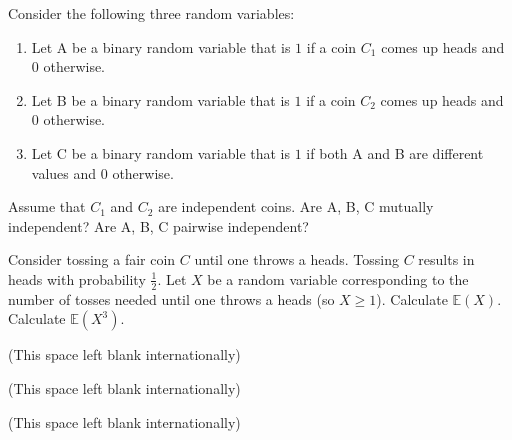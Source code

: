 \documentclass[12pt,twoside]{article}
\begin{document}
\newpage

\begin{problem}{10}
Consider the following three random variables:
\begin{enumerate}
\item Let A be a binary random variable that is $1$ if a coin $C_1$ comes up heads and $0$ otherwise.
\item Let B be a binary random variable that is $1$ if a coin $C_2$ comes up heads and $0$ otherwise.
\item Let C be a binary random variable that is $1$ if both A and B are different values and $0$ otherwise.
\end{enumerate}
Assume that $C_1$ and $C_2$ are independent coins.
\bparts
{} Are A, B, C mutually independent?
 Are A, B, C pairwise independent?
\eparts
\end{problem}
\newpage

\begin{problem}{10}
Consider tossing a fair coin $C$ until one throws a heads.  Tossing $C$ results in heads with probability $\frac{1}{2}$.  Let $X$ be a random variable corresponding to the number of tosses needed until one throws a heads (so $X \geq 1$).  
\bparts
{} Calculate $\mathbb{E}(X)$.
 Calculate $\mathbb{E}(X^3)$.

\eparts
\end{problem}

\newpage 

\begin{center}
(This space left blank internationally)
\end{center}

\newpage
\begin{center}
(This space left blank internationally)
\end{center}

\mbox{}

\newpage
\begin{center}
(This space left blank internationally)
\end{center}

\mbox{}
\end{document}
